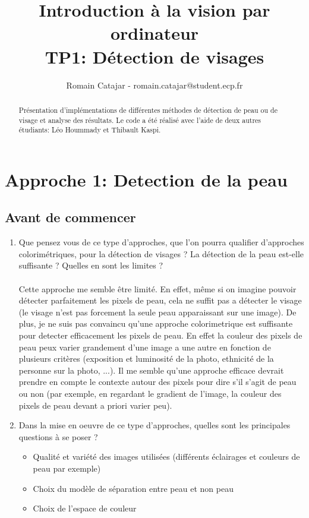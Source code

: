 \documentclass{article}
\begin{document}
\title{Introduction à la vision par ordinateur \\
TP1: Détection de visages}
\author{Romain Catajar - romain.catajar@student.ecp.fr}
\maketitle

\begin{abstract}
Présentation d'implémentations de différentes méthodes de détection de peau ou de visage et analyse des résultats. Le code a été réalisé avec l'aide de deux autres étudiants: Léo Hoummady et Thibault Kaspi.
\end{abstract}
\section{Approche 1: Detection de la peau}
\subsection{Avant de commencer}
\begin{enumerate}
    \item Que pensez vous de ce type d'approches, que l'on pourra qualifier
d'approches colorimétriques, pour la détection de visages ? La détection
de la peau est-elle suffisante ? Quelles en sont les limites ?\\\\
Cette approche me semble être limité. En effet, même si on imagine pouvoir détecter parfaitement les pixels de peau, cela ne suffit pas a détecter le visage (le visage n'est pas forcement la seule peau apparaissant sur une image). De plus, je ne suis pas convaincu qu'une approche colorimetrique est suffisante pour detecter efficacement les pixels de peau. En effet la couleur des pixels de peau peux varier grandement d'une image a une autre en fonction de plusieurs critères (exposition et luminosité de la photo, ethnicité de la personne sur la photo, ...). Il me semble qu'une approche efficace devrait prendre en compte le contexte autour des pixels pour dire s'il s'agit de peau ou non (par exemple, en regardant le gradient de l'image, la couleur des pixels de peau devant a priori varier peu).\\

    \item Dans la mise en oeuvre de ce type d'approches, quelles sont les principales questions à se poser ? \\
    \begin{itemize}
        \item Qualité et variété des images utilisées (différents éclairages et couleurs de peau par exemple)
        \item Choix du modèle de séparation entre peau et non peau
        \item Choix de l'espace de couleur
    \end{itemize}
\end{enumerate}
\end{document}
